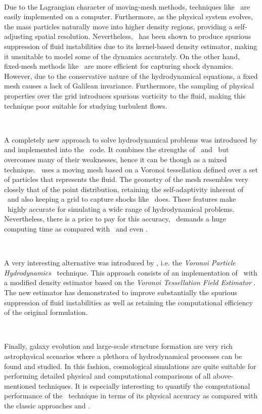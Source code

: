 \documentclass[a4,useAMS,usenatbib,usegraphicx,12pt]{article}
\begin{document}
\

Due to the Lagrangian character of moving-mesh methods, techniques like \SPH\ 
are easily implemented on a computer. Furthermore, as the physical system 
evolves, the mass particles naturally move into higher density regions, 
providing a self-adjusting spatial resolution. Nevertheless, \SPH\ has been 
shown to produce spurious suppression of fluid instabilities due to its 
kernel-based density estimator, making it unsuitable to model some of the 
dynamics accurately. On the other hand, fixed-mesh methods like \AMR\ are more 
efficient for capturing shock dynamics. However, due to the conservative nature 
of the hydrodynamical equations, a fixed mesh causes a lack of Galilean 
invariance. Furthermore, the sampling of physical properties over the grid 
introduces spurious vorticity to the fluid, making this technique poor suitable 
for studying turbulent flows.

\

A completely new approach to solve hydrodynamical problems was introduced by 
\citet{Springel10} and implemented into the \AREPO\ code. It combines the 
strengths of \AMR\ and \SPH\ but overcomes many of their weaknesses, hence it 
can be though as a mixed technique. \AREPO\ uses a moving mesh based on a 
Voronoi tessellation defined over a set of particles that represents the fluid. 
The geometry of the mesh resembles very closely that of the point distribution,
retaining the self-adaptivity inherent of \SPH\ and also keeping a grid to 
capture shocks like \AMR\ does. These features make \AREPO\ highly accurate for
simulating a wide range of hydrodynamical problems. Nevertheless, there is a 
price to pay for this accuracy, \AREPO\ demands a huge computing time as 
compared with \SPH\ and even \AMR.

\

A very interesting alternative was introduced by \citet{Hess10}, i.e. the 
\textit{Voronoi Particle Hydrodynamics} \VPH\ technique. This approach consists
of an implementation of \SPH\ with a modified density estimator based on the  
\textit{Voronoi Tessellation Field Estimator} \VTFE. The new estimator
has demonstrated to improve substantially the spurious suppression of fluid 
instabilities as well as retaining the computational efficiency of the original 
formulation.

\

Finally, galaxy evolution and large-scale structure formation are very rich 
astrophysical scenarios where a plethora of hydrodynamical processes can be 
found and studied. In this fashion, cosmological simulations are quite suitable 
for performing detailed physical and computational comparisons of all 
above-mentioned techniques. It is especially interesting to quantify the 
computational performance of the \VPH\ technique in terms of its physical 
accuracy as compared with the classic approaches and \AREPO.
\end{document}
